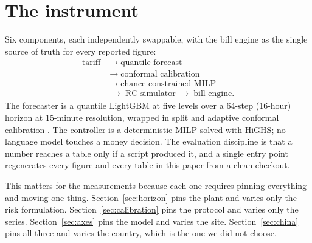 \section{The instrument}
\label{sec:instrument}

Six components, each independently swappable, with the bill engine as the single
source of truth for every reported figure:
%
\begin{align*}
\text{tariff} &\;\rightarrow\; \text{quantile forecast}\\
  &\;\rightarrow\; \text{conformal calibration}\\
  &\;\rightarrow\; \text{chance-constrained MILP}\\
  &\;\rightarrow\; \text{RC simulator}
    \;\rightarrow\; \text{bill engine}.
\end{align*}
%
The forecaster is a quantile LightGBM \citep{ke2017lightgbm} at five levels
over a 64-step (16-hour) horizon at 15-minute resolution, wrapped in split and
adaptive conformal calibration
\citep{angelopoulos2023gentle,gibbs2021adaptive}. The controller is a
deterministic MILP solved with HiGHS; no
language model touches a money decision. The evaluation discipline is that a
number reaches a table only if a script produced it, and a single entry point
regenerates every figure and every table in this paper from a clean checkout.

This matters for the measurements because each one requires pinning everything
and moving one thing. Section~\ref{sec:horizon} pins the plant and varies only
the risk formulation. Section~\ref{sec:calibration} pins the protocol and varies
only the series. Section~\ref{sec:axes} pins the model and varies the site.
Section~\ref{sec:china} pins all three and varies the country, which is the one
we did not choose.
